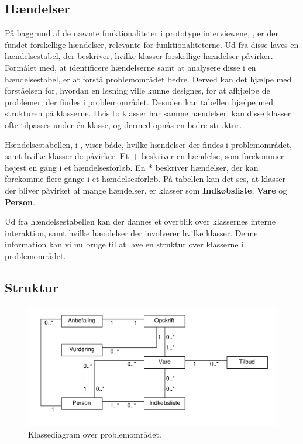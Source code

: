 \subsection{Hændelser}\label{handelser}
På baggrund af de nævnte funktionaliteter i prototype interviewene, , er der fundet forskellige hændelser, relevante for funktionaliteterne.
Ud fra disse laves en hændelsestabel, der beskriver, hvilke klasser forskellige hændelser påvirker.
Formålet med, at identificere hændelserne samt at analysere disse i en hændelsestabel, er at forstå problemområdet bedre.
Derved kan det hjælpe med forståelsen for, hvordan en løsning ville kunne designes, for at afhjælpe de problemer, der findes i problemområdet. 
Desuden kan tabellen hjælpe med strukturen på klasserne.
Hvis to klasser har samme hændelser, kan disse klasser ofte tilpasses under én klasse, og dermed opnås en bedre struktur.



Hændelsestabellen, i , viser både, hvilke hændelser der findes i problemområdet, samt hvilke klasser de påvirker.
Et \textbf{+} beskriver en hændelse, som forekommer højest en gang i et hændelsesforløb.
En \textbf{*} beskriver hændelser, der kan forekomme flere gange i et hændelsesforløb.\citep{OOA&D2001}
På tabellen kan det ses, at klasser der bliver påvirket af mange hændelser, er klasser som \textbf{Indkøbsliste}, \textbf{Vare} og \textbf{Person}.

Ud fra hændelsestabellen kan der dannes et overblik over klassernes interne interaktion, samt hvilke hændelser der involverer hvilke klasser.
Denne information kan vi nu bruge til at lave en struktur over klasserne i problemområdet.

\newpage
\subsection{Struktur}\label{sec:struktur}
\begin{figure}[h]
	\centering
		\includegraphics[scale=0.6]{images/Diagrams/klassediagram_model_simple.pdf}
	\caption{Klassediagram over problemområdet.}\label{figur:PDklasse}
\end{figure}

